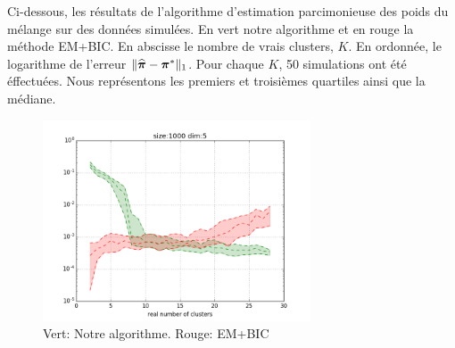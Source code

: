 Ci-dessous, les résultats de l'algorithme d'estimation parcimonieuse des poids du mélange sur des données simulées. En vert notre algorithme et en rouge la méthode EM+BIC. En abscisse le nombre de vrais clusters, $K$. En ordonnée, le logarithme de l'erreur $\|\widehat{\boldsymbol \pi}-\boldsymbol \pi^*\|_1$. Pour chaque $K$, 50 simulations ont été éffectuées. Nous représentons les premiers et troisièmes quartiles ainsi que la médiane.
\begin{figure}[H]
\center
  \includegraphics[width=300px]{./TeX_files/SparseWeightsVectorEstimation.png}
  \caption{Vert: Notre algorithme. Rouge: EM+BIC}
\end{figure}
